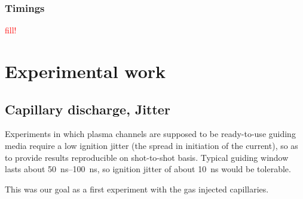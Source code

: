 \documentclass[justified,nofonts,nobib]{tufte-book}
\begin{document}
\subsection{Timings}
	\textcolor{red}{fill!}
	
\chapter{Experimental work}\label{chap:Experimental_work}
\section{Capillary discharge, Jitter}\label{sec:jitter}
Experiments in which plasma channels are supposed to be ready-to-use guiding media require a low ignition jitter (the spread in initiation of the current), so as to provide results reproducible on shot-to-shot basis. Typical guiding window lasts about \SIrange{50}{100}{\ns}, so ignition jitter of about \SI{10}{ns} would be tolerable.

This was our goal as a first experiment with the gas injected capillaries.
\end{document}
